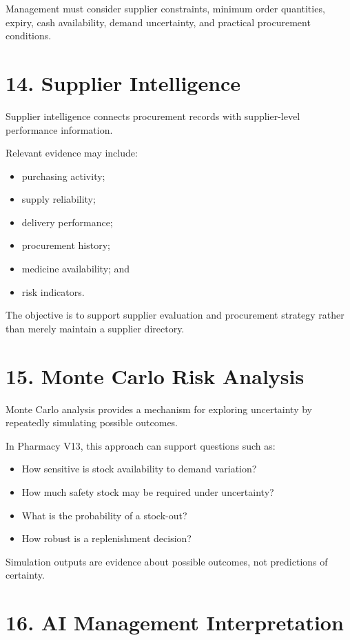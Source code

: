 \documentclass[12pt,a4paper]{article}
\begin{document}
Management must consider supplier constraints, minimum order quantities, expiry, cash availability, demand uncertainty, and practical procurement conditions.

\section*{14. Supplier Intelligence}

Supplier intelligence connects procurement records with supplier-level performance information.

Relevant evidence may include:

\begin{itemize}[leftmargin=1cm]
\item purchasing activity;
\item supply reliability;
\item delivery performance;
\item procurement history;
\item medicine availability; and
\item risk indicators.
\end{itemize}

The objective is to support supplier evaluation and procurement strategy rather than merely maintain a supplier directory.

\section*{15. Monte Carlo Risk Analysis}

Monte Carlo analysis provides a mechanism for exploring uncertainty by repeatedly simulating possible outcomes.

In Pharmacy V13, this approach can support questions such as:

\begin{itemize}[leftmargin=1cm]
\item How sensitive is stock availability to demand variation?
\item How much safety stock may be required under uncertainty?
\item What is the probability of a stock-out?
\item How robust is a replenishment decision?
\end{itemize}

Simulation outputs are evidence about possible outcomes, not predictions of certainty.

\section*{16. AI Management Interpretation}
\end{document}
